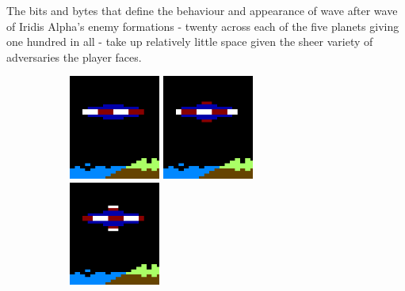 The bits and bytes that define the behaviour and appearance of
wave after wave of Iridis Alpha's enemy formations - twenty across each of the
five planets giving one hundred in all - take up relatively little space given
the sheer variety of adversaries the player faces.


\begin{figure}[H]
  {
    \setlength{\tabcolsep}{3.0pt}
    \setlength\cmidrulewidth{\heavyrulewidth} %
	\begin{subfigure}{1\textwidth}
  \hspace{0.2cm}
    \includegraphics[width=3cm]{src/sprites/gallery/sprite_160.png}%
  \hspace{1.3cm}
    \includegraphics[width=3cm]{src/sprites/gallery/sprite_161.png}%
  \hspace{1.4cm}
    \includegraphics[width=3cm]{src/sprites/gallery/sprite_162.png}%
	\end{subfigure}
  }
  \vspace{1.4cm}

  {
  \setlength{\tabcolsep}{3.0pt}
  \setlength\cmidrulewidth{\heavyrulewidth} %
  \begin{adjustbox}{width=13cm}


\end{adjustbox}}
\end{figure}
